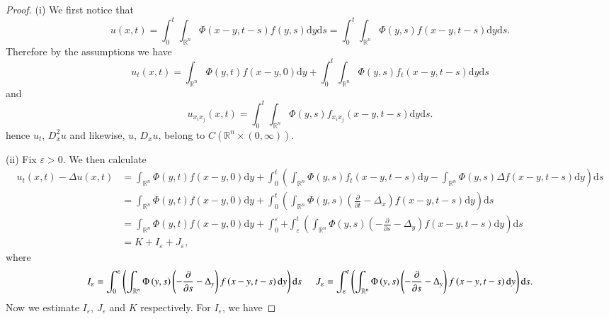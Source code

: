 \begin{proof}
(i) We first notice that 
$$
u\left( x,t \right) =\int_0^t{\int_{\mathbb{R} ^n}{\Phi \left( x-y,t-s \right) f\left( y,s \right) \mathrm{d}y}\mathrm{d}s}=\int_0^t{\int_{\mathbb{R} ^n}{\Phi \left( y,s \right) f\left( x-y,t-s \right) \mathrm{d}y}\mathrm{d}s}.
$$
Therefore by the assumptions we have 
$$
u_t\left( x,t \right) =\int_{\mathbb{R} ^n}{\Phi \left( y,t \right) f\left( x-y,0 \right) \mathrm{d}y}+\int_0^t{\int_{\mathbb{R} ^n}{\Phi \left( y,s \right) f_t\left( x-y,t-s \right) \mathrm{d}y}\mathrm{d}s}
$$
and 
$$
u_{x_ix_j}\left( x,t \right) =\int_0^t{\int_{\mathbb{R} ^n}{\Phi \left( y,s \right) f_{x_ix_j}\left( x-y,t-s \right) \mathrm{d}y}\mathrm{d}s}.
$$
hence $u_t$, $D_x^2u$ and likewise, $u$, $D_xu$, belong to $C(\mathbb{R}^n\times(0,\infty))$.\par
(ii) Fix $\varepsilon>0$. We then calculate 
$$
\begin{aligned}
u_t\left( x,t \right) -\Delta u\left( x,t \right) &=\int_{\mathbb{R} ^n}{\Phi \left( y,t \right) f\left( x-y,0 \right) \mathrm{d}y}+\int_0^t{\left( \int_{\mathbb{R} ^n}{\Phi \left( y,s \right) f_t\left( x-y,t-s \right) \mathrm{d}y}-\int_{\mathbb{R} ^n}{\Phi \left( y,s \right) \Delta f\left( x-y,t-s \right) \mathrm{d}y} \right) \mathrm{d}s}
\\
&=\int_{\mathbb{R} ^n}{\Phi \left( y,t \right) f\left( x-y,0 \right) \mathrm{d}y}+\int_0^t{\left( \int_{\mathbb{R} ^n}{\Phi \left( y,s \right) \left( \frac{\partial}{\partial t}-\Delta _x \right) f\left( x-y,t-s \right) \mathrm{d}y} \right) \mathrm{d}s}
\\
&=\int_{\mathbb{R} ^n}{\Phi \left( y,t \right) f\left( x-y,0 \right) \mathrm{d}y}+\int_0^{\varepsilon}{+\int_{\varepsilon}^t{\left( \int_{\mathbb{R} ^n}{\Phi \left( y,s \right) \left( -\frac{\partial}{\partial s}-\Delta _y \right) f\left( x-y,t-s \right) \mathrm{d}y} \right) \mathrm{d}s}}
\\
&=K+I_{\varepsilon}+J_{\varepsilon},
\end{aligned}
$$
where 
$$
I_{\varepsilon}=\int_0^{\varepsilon}{\left( \int_{\mathbb{R} ^n}{\Phi \left( y,s \right) \left( -\frac{\partial}{\partial s}-\Delta _y \right) f\left( x-y,t-s \right) \mathrm{d}y} \right) \mathrm{d}s}\hspace{0.5cm}J_{\varepsilon}=\int_{\varepsilon}^t{\left( \int_{\mathbb{R} ^n}{\Phi \left( y,s \right) \left( -\frac{\partial}{\partial s}-\Delta _y \right) f\left( x-y,t-s \right) \mathrm{d}y} \right) \mathrm{d}s}.
$$
Now we estimate $I_\varepsilon$, $J_\varepsilon$ and $K$ respectively. For $I_\varepsilon$, we have 

\end{proof}

